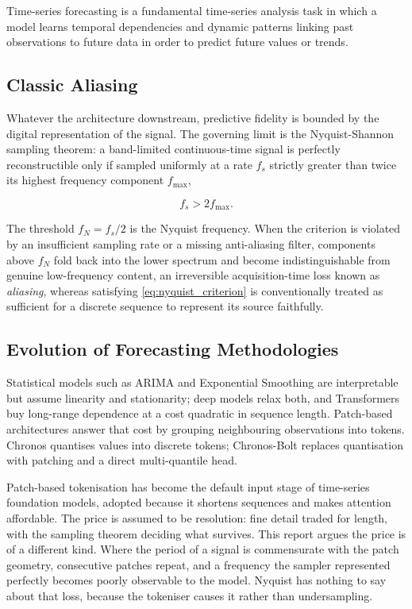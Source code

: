 Time-series forecasting is a fundamental time-series analysis task in which a model learns temporal dependencies and dynamic patterns linking past observations to future data in order to predict future values or trends\autocite{wangDeepTimeSeries2026}.

\subsection*{Classic Aliasing}
Whatever the architecture downstream, predictive fidelity is bounded by the digital representation of the signal. The governing limit is the Nyquist-Shannon sampling theorem: a band-limited continuous-time signal is perfectly reconstructible only if sampled uniformly at a rate $f_s$ strictly greater than twice its highest frequency component $f_{\max}$,

\begin{equation}
\label{eq:nyquist_criterion}
f_s > 2f_{\max}.
\end{equation}

The threshold $f_N = f_s/2$ is the Nyquist frequency. When the criterion is violated by an insufficient sampling rate or a missing anti-aliasing filter, components above $f_N$ fold back into the lower spectrum and become indistinguishable from genuine low-frequency content, an irreversible acquisition-time loss known as \textit{aliasing}, whereas satisfying \autoref{eq:nyquist_criterion} is conventionally treated as sufficient for a discrete sequence to represent its source faithfully.

\subsection*{Evolution of Forecasting Methodologies}
Statistical models such as ARIMA and Exponential Smoothing are interpretable but assume linearity and stationarity; deep models relax both, and Transformers buy long-range dependence at a cost quadratic in sequence length\autocite{wangDeepTimeSeries2026}. Patch-based architectures answer that cost by grouping neighbouring observations into tokens. Chronos quantises values into discrete tokens\autocite{ansariChronosLearningLanguage2024}; Chronos-Bolt replaces quantisation with patching and a direct multi-quantile head\autocite{ansariChronosLearningLanguage2024a,FastAccurateZeroshot2024a,AmazonChronosbolttinyHugging2025}.

Patch-based tokenisation has become the default input stage of time-series foundation models, adopted because it shortens sequences and makes attention affordable. The price is assumed to be resolution: fine detail traded for length, with the sampling theorem deciding what survives. This report argues the price is of a different kind. Where the period of a signal is commensurate with the patch geometry, consecutive patches repeat, and a frequency the sampler represented perfectly becomes poorly observable to the model. Nyquist has nothing to say about that loss, because the tokeniser causes it rather than undersampling.

